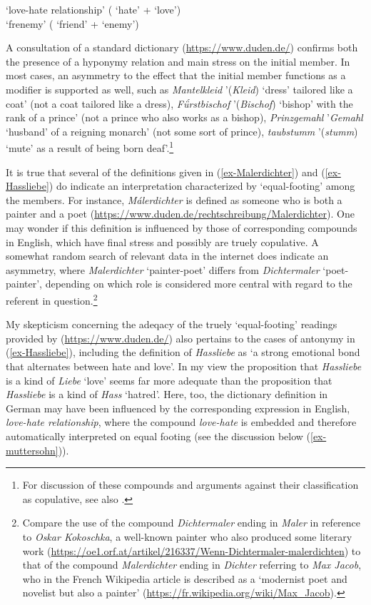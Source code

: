 \documentclass[output=paper
 ,nobabel
 ,draftmode
 ,colorlinks, citecolor=brown
]{langscibook}
\begin{document}
\ex\label{ex-Hassliebe}
 `love-hate relationship' ( `hate' +  `love') \\
 `frenemy' ( `friend' +  `enemy')

\zl

\noindent
A consultation of a standard dictionary (\url{https://www.duden.de/}) confirms both the presence of
a hyponymy relation and main stress on the initial member. In most cases, an asymmetry to the effect
that the initial member functions as a modifier is supported as well, such as \emph{Mantelkleid}
'(\emph{Kleid}) `dress' tailored like a coat' (not a coat tailored like a dress), \emph{Fǘrstbischof} '(\emph{Bischof}) `bishop' with the rank of a prince' (not a prince who also works as a bishop),
\emph{Prinzgemahl} '\emph{Gemahl} `husband' of a reigning monarch' (not some sort of prince), \emph{taubstumm} '(\emph{stumm}) `mute' as a result of being born deaf'.\footnote{For discussion of these compounds and arguments against their classification as copulative, see also .}

It is true that several of the definitions given in (\ref{ex-Malerdichter}) and (\ref{ex-Hassliebe}) do indicate an interpretation characterized by `equal-footing' among the members. For instance, \emph{Málerdichter} is defined as someone who is both a painter and a poet (\url{https://www.duden.de/rechtschreibung/Malerdichter}). One may wonder if this definition is influenced by those of corresponding compounds in English, which have final stress and possibly are truely copulative. A somewhat random search of relevant data in the internet does indicate an asymmetry, where \emph{Malerdichter} `painter-poet' differs from \emph{Dichtermaler} `poet-painter', depending on which role is considered more central with regard to the referent in question.\footnote{Compare the use of the compound \emph{Dichtermaler} ending in \emph{Maler} in reference to \emph{Oskar Kokoschka}, a well-known painter who also produced some literary work (\url{https://oe1.orf.at/artikel/216337/Wenn-Dichtermaler-malerdichten}) to that of the compound \emph{Malerdichter} ending in \emph{Dichter} referring to \emph{Max Jacob}, who in the French Wikipedia article is described as a `modernist poet and novelist but also a painter'  (\url{https://fr.wikipedia.org/wiki/Max_Jacob}).} 

\largerpage
My skepticism concerning the adeqacy of the truely `equal-footing' readings provided by
(\url{https://www.duden.de/}) also pertains to the cases of antonymy in (\ref{ex-Hassliebe}),
including the definition of \emph{Hassliebe} as `a strong emotional bond that alternates between
hate and love'. In my view the proposition that \emph{Hassliebe} is a kind of \emph{Liebe} `love'
seems far more adequate than the proposition that \emph{Hassliebe} is a kind of \emph{Hass}
`hatred'. Here, too, the dictionary definition in German may have been influenced by the
corresponding expression in English, \emph{love-hate relationship}, where the compound
\emph{love-hate} is embedded and therefore automatically interpreted on equal footing (see the
discussion below (\ref{ex-muttersohn})).
\end{document}
